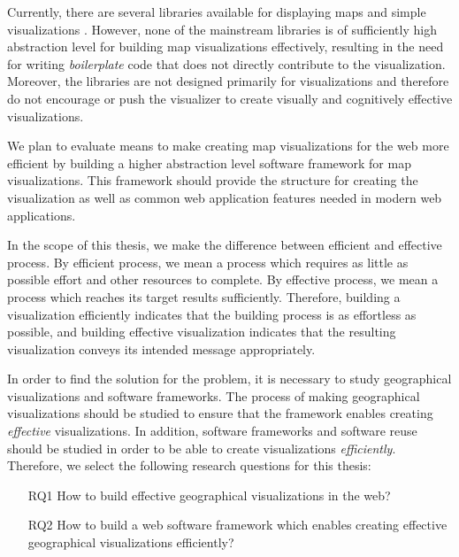 Currently, there are several libraries available for displaying maps and simple visualizations . However, none of the mainstream libraries is of sufficiently high abstraction level for building map visualizations effectively, resulting in the need for writing \emph{boilerplate} code that does not directly contribute to the visualization. Moreover, the libraries are not designed primarily for visualizations and therefore do not encourage or push the visualizer to create visually and cognitively effective visualizations.

We plan to evaluate means to make creating map visualizations for the web more efficient by building a higher abstraction level software framework for map visualizations. This framework should provide the structure for creating the visualization as well as common web application features needed in modern web applications.

In the scope of this thesis, we make the difference between efficient and effective process. By efficient process, we mean a process which requires as little as possible effort and other resources to complete. By effective process, we mean a process which reaches its target results sufficiently. Therefore, building a visualization efficiently indicates that the building process is as effortless as possible, and building effective visualization indicates that the resulting visualization conveys its intended message appropriately.

In order to find the solution for the problem, it is necessary to study geographical visualizations and software frameworks. The process of making geographical visualizations should be studied to ensure that the framework enables creating \emph{effective} visualizations. In addition, software frameworks and software reuse should be studied in order to be able to create visualizations \emph{efficiently}. Therefore, we select the following research questions for this thesis:

\begin{enumerate}
	\item[RQ1] How to build effective geographical visualizations in the web?
	\item[RQ2] How to build a web software framework which enables creating effective geographical visualizations efficiently?

\end{enumerate}

